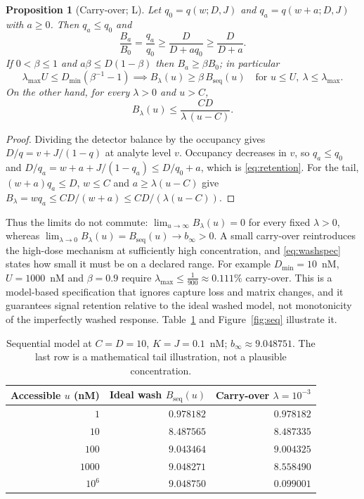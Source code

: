 \documentclass[11pt]{article}
\theoremstyle{plain}
\newtheorem{proposition}[theorem]{Proposition}
\theoremstyle{definition}
\numberwithin{equation}{section}
\newcommand{\Bseq}{B_{\mathrm{seq}}}
\newcommand{\Lean}{\textsf{L}}   %
\begin{document}
\begin{proposition}[Carry-over; \Lean]\label{prop:carry}
Let $q_0=q(w;D,J)$ and $q_a=q(w+a;D,J)$ with $a\ge0$. Then $q_a\le q_0$ and
\begin{equation}\label{eq:retention}
 \frac{B_a}{B_0}=\frac{q_a}{q_0}\ge\frac{D}{D+aq_0}\ge\frac{D}{D+a}.
\end{equation}
If $0<\beta\le1$ and $a\beta\le D(1-\beta)$ then $B_a\ge\beta B_0$; in particular
\begin{equation}\label{eq:washspec}
 \lambda_{\max}U\le D_{\min}(\beta^{-1}-1)
 \implies B_\lambda(u)\ge\beta\,\Bseq(u)\quad\text{for }u\le U,\ \lambda\le\lambda_{\max}.
\end{equation}
On the other hand, for every $\lambda>0$ and $u>C$,
\begin{equation}\label{eq:carrytail}
 B_\lambda(u)\le\frac{CD}{\lambda\,(u-C)} .
\end{equation}
\end{proposition}
\begin{proof}
Dividing the detector balance by the occupancy gives $D/q=v+J/(1-q)$ at analyte
level $v$. Occupancy decreases in $v$, so $q_a\le q_0$ and
$D/q_a=w+a+J/(1-q_a)\le D/q_0+a$, which is \eqref{eq:retention}. For the tail,
$(w+a)q_a\le D$, $w\le C$ and $a\ge\lambda(u-C)$ give
$B_\lambda=wq_a\le CD/(w+a)\le CD/(\lambda(u-C))$.
\end{proof}
Thus the limits do not commute: $\lim_{u\to\infty}B_\lambda(u)=0$ for every fixed
$\lambda>0$, whereas $\lim_{\lambda\to0}B_\lambda(u)=\Bseq(u)\to b_\infty>0$. A small
carry-over reintroduces the high-dose mechanism at sufficiently high concentration,
and \eqref{eq:washspec} states how small it must be on a declared range. For example
$D_{\min}=10$~nM, $U=1000$~nM and $\beta=0.9$ require
$\lambda_{\max}\le\frac1{900}\approx0.111\%$ carry-over. This is a model-based
specification that ignores capture loss and matrix changes, and it guarantees signal
retention relative to the ideal washed model, not monotonicity of the imperfectly
washed response. Table~\ref{tab:seq} and Figure~\ref{fig:seq} illustrate it.

\begin{table}[t]
\centering\small
\caption{Sequential model at $C=D=10$, $K=J=0.1$~nM; $b_\infty\approx9.048751$. The
last row is a mathematical tail illustration, not a plausible concentration.}
\label{tab:seq}
\begin{tabular}{@{}rrr@{}}\toprule
Accessible $u$ (nM) & Ideal wash $\Bseq(u)$ & Carry-over $\lambda=10^{-3}$\\\midrule
$1$ & $0.978182$ & $0.978182$\\
$10$ & $8.487565$ & $8.487335$\\
$100$ & $9.043464$ & $9.004325$\\
$1000$ & $9.048271$ & $8.558490$\\
$10^6$ & $9.048750$ & $0.099001$\\\bottomrule
\end{tabular}
\end{table}
\end{document}
